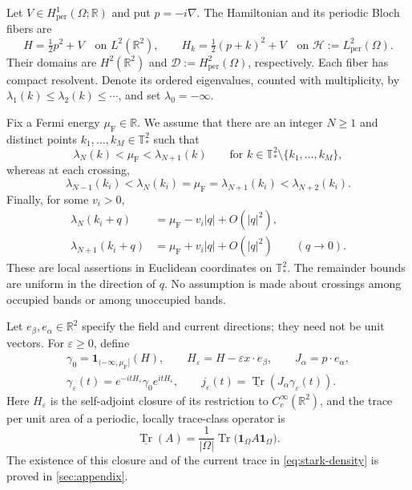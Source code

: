 \documentclass[11pt,a4paper]{article}
\newcommand{\R}{\mathbb R}
\newcommand{\T}{\mathbb T_{\!*}^{2}}
\newcommand{\HH}{\mathscr H}
\newcommand{\DD}{\mathscr D}
\newcommand{\one}{\mathbf 1}
\newcommand{\trv}{\underline{\operatorname{Tr}}}
\DeclareMathOperator{\Tr}{Tr}
\numberwithin{equation}{section}
\begin{document}
Let $V\in H^1_{\mathrm{per}}(\Omega;\R)$ and put $p=-i\nabla$. The
Hamiltonian and its periodic Bloch fibers are
\begin{equation}\label{eq:hamiltonians}
 H=\tfrac12p^2+V\quad\text{on }L^2(\R^2),
 \qquad
 H_k=\tfrac12(p+k)^2+V\quad\text{on }\HH:=L^2_{\mathrm{per}}(\Omega).
\end{equation}
Their domains are $H^2(\R^2)$ and
$\DD:=H^2_{\mathrm{per}}(\Omega)$, respectively. Each fiber has compact
resolvent. Denote its ordered eigenvalues, counted with multiplicity, by
$\lambda_1(k)\leq\lambda_2(k)\leq\cdots$, and set
$\lambda_0=-\infty$.

Fix a Fermi energy $\mu_{\mathrm F}\in\R$. We assume that there are an
integer $N\geq1$ and distinct points $k_1,\ldots,k_M\in\T$ such that
\begin{equation}\label{eq:fermi-gap}
 \lambda_N(k)<\mu_{\mathrm F}<\lambda_{N+1}(k)
 \qquad\text{for }k\in\T\setminus\{k_1,\ldots,k_M\},
\end{equation}
whereas at each crossing,
\begin{equation}\label{eq:isolated-double}
 \lambda_{N-1}(k_i)<\lambda_N(k_i)=\mu_{\mathrm F}
 =\lambda_{N+1}(k_i)<\lambda_{N+2}(k_i).
\end{equation}
Finally, for some $v_i>0$,
\begin{equation}\label{eq:cones}
 \begin{split}
 \lambda_N(k_i+q)&=\mu_{\mathrm F}-v_i|q|+O(|q|^2),\\
 \lambda_{N+1}(k_i+q)&=\mu_{\mathrm F}+v_i|q|+O(|q|^2)
 \qquad(q\longrightarrow0).
 \end{split}
\end{equation}
These are local assertions in Euclidean coordinates on $\T$. The
remainder bounds are uniform in the direction of $q$. No assumption is
made about crossings among occupied bands or among unoccupied bands.

Let $e_\beta,e_\alpha\in\R^2$ specify the field and current directions;
they need not be unit vectors. For $\varepsilon\geq0$, define
\begin{equation}\label{eq:stark-density}
 \begin{gathered}
 \gamma_0=\one_{(-\infty,\mu_{\mathrm F}]}(H),\qquad
 H_\varepsilon=H-\varepsilon x\cdot e_\beta,\qquad
 J_\alpha=p\cdot e_\alpha,\\
 \gamma_\varepsilon(t)
 =e^{-itH_\varepsilon}\gamma_0e^{itH_\varepsilon},\qquad
 j_\varepsilon(t)=\trv(J_\alpha\gamma_\varepsilon(t)).
 \end{gathered}
\end{equation}
Here $H_\varepsilon$ is the self-adjoint closure of its restriction to
$C_c^\infty(\R^2)$, and the trace per unit area of a periodic, locally
trace-class operator is
\begin{equation}\label{eq:trace-definition}
 \trv(A)=\frac1{|\Omega|}
 \Tr\bigl(\one_\Omega A\one_\Omega\bigr).
\end{equation}
The existence of this closure and of the current trace in
\eqref{eq:stark-density} is proved in \cref{sec:appendix}.
\end{document}
